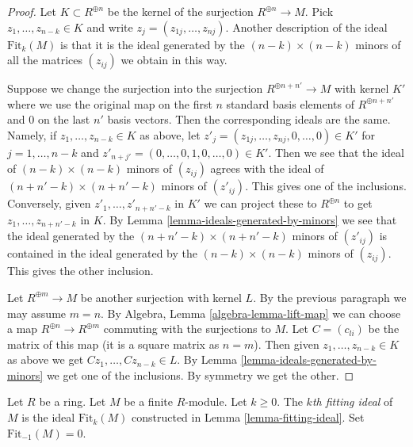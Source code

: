 \begin{proof}
Let $K \subset R^{\oplus n}$ be the kernel of the surjection
$R^{\oplus n} \to M$. Pick $z_1, \ldots, z_{n - k} \in K$
and write $z_j = (z_{1j}, \ldots, z_{nj})$.
Another description of the ideal $\text{Fit}_k(M)$
is that it is the ideal generated by the $(n - k) \times (n - k)$ minors of
all the matrices $(z_{ij})$ we obtain in this way.

\medskip\noindent
Suppose we change the surjection into the surjection
$R^{\oplus n + n'} \to M$ with kernel $K'$ where we use the original
map on the first $n$ standard basis elements of $R^{\oplus n + n'}$
and $0$ on the last $n'$ basis vectors. Then the corresponding ideals
are the same. Namely, if $z_1, \ldots, z_{n - k} \in K$ as above,
let $z'_j = (z_{1j}, \ldots, z_{nj}, 0, \ldots, 0) \in K'$ for
$j = 1, \ldots, n - k$ and
$z'_{n + j'} = (0, \ldots, 0, 1, 0, \ldots, 0) \in K'$. Then we see that
the ideal of $(n - k) \times (n - k)$ minors of $(z_{ij})$ agrees
with the ideal of $(n + n' - k) \times (n + n' - k)$ minors of
$(z'_{ij})$. This gives one of the inclusions.
Conversely, given  $z'_1, \ldots, z'_{n + n' - k}$
in $K'$ we can project these to $R^{\oplus n}$ to get
$z_1, \ldots, z_{n + n' - k}$ in $K$. By
Lemma \ref{lemma-ideals-generated-by-minors}
we see that the ideal generated by the
$(n + n' - k) \times (n + n' - k)$ minors of
$(z'_{ij})$ is contained in the ideal generated by the
$(n - k) \times (n - k)$ minors of $(z_{ij})$. This gives the
other inclusion.

\medskip\noindent
Let $R^{\oplus m} \to M$ be another surjection with kernel $L$.
By the previous paragraph we may assume $m = n$.
By Algebra, Lemma \ref{algebra-lemma-lift-map} we can choose a map
$R^{\oplus n} \to R^{\oplus m}$ commuting with the surjections to $M$.
Let $C = (c_{li})$ be the matrix of this map (it is a square
matrix as $n = m$). Then given
$z_1, \ldots, z_{n - k} \in K$ as above we get
$Cz_1, \ldots, Cz_{n - k} \in L$. By
Lemma \ref{lemma-ideals-generated-by-minors} we get one of the
inclusions. By symmetry we get the other.
\end{proof}

\begin{definition}
\label{definition-fitting-ideal}
Let $R$ be a ring. Let $M$ be a finite $R$-module. Let $k \geq 0$.
The {\it $k$th fitting ideal} of $M$ is the ideal $\text{Fit}_k(M)$
constructed in Lemma \ref{lemma-fitting-ideal}. Set $\text{Fit}_{-1}(M) = 0$.
\end{definition}

